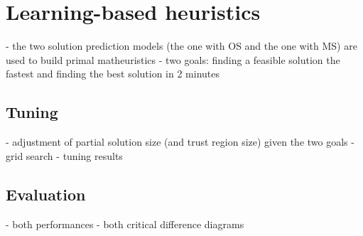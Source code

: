 \section{Learning-based heuristics}

- the two solution prediction models (the one with OS and the one with MS) are used to build primal matheuristics
- two goals: finding a feasible solution the fastest and finding the best solution in 2 minutes

\subsection{Tuning}

- adjustment of partial solution size (and trust region size) given the two goals
- grid search
- tuning results

\subsection{Evaluation}

- both performances
- both critical difference diagrams

